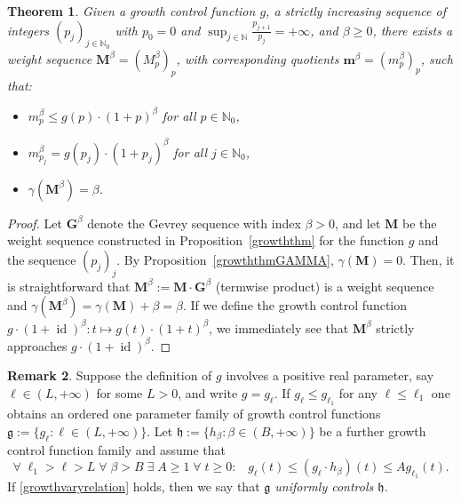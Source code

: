 \documentclass[12pt,a4paper]{article}
\newcommand{\M}{{\boldsymbol{M}}}
\newcommand{\m}{{\boldsymbol{m}}}
\newcommand{\id}{\operatorname{id}}
\newcommand{\ga}{\gamma}
\theoremstyle{plain}
\newtheorem{theorem}{Theorem}[section]
\theoremstyle{definition}
\newtheorem{remark}[theorem]{Remark}
\numberwithin{equation}{section}
\begin{document}
\begin{theorem}\label{growththm1}
Given a growth control function $g$, a strictly increasing sequence of integers  $(p_j)_{j\in\mathbb{N}_0}$ with $p_0=0$ and $\sup_{j\in\mathbb{N}}\frac{p_{j+1}}{p_j}=+\infty$, and $\beta\ge 0$, there exists a weight sequence $\M^{\beta}=(M^{\beta}_p)_p$, with corresponding quotients $\m^{\beta}=(m_p^\beta)_p$, such that:
\begin{itemize}
\item[$(i)$] $m^{\beta}_p\le g(p)\cdot(1+p)^{\beta}$ for all $p\in\mathbb{N}_0$,

\item[$(ii)$] $m^{\beta}_{p_j}=g(p_j)\cdot(1+p_j)^{\beta}$ for all $j\in\mathbb{N}_0$,

\item[$(iii)$] $\gamma(\M^{\beta})=\beta$.
\end{itemize}
\end{theorem}

\begin{proof}
Let $\boldsymbol{G}^{\beta}$ denote the Gevrey sequence with index $\beta>0$, and let $\M$ be the weight sequence constructed in Proposition~\ref{growththm} for the function $g$ and the sequence $(p_j)_j$. By Proposition~\ref{growththmGAMMA}, $\ga(\M)=0$. Then, it is straightforward that $\boldsymbol{M}^{\beta}:=\boldsymbol{M}\cdot\boldsymbol{G}^{\beta}$ (termwise product) is a weight sequence and $\gamma(\boldsymbol{M}^{\beta})=\gamma(\boldsymbol{M})+\beta=\beta$.
If we define the growth control function $g\cdot(1+\id)^{\beta}: t\mapsto g(t)\cdot(1+t)^{\beta}$, we immediately see that $\boldsymbol{M}^{\beta}$ strictly approaches $g\cdot(1+\id)^{\beta}$. \end{proof}

\begin{remark}
Suppose the definition of $g$ involves a positive real parameter, say $\ell\in(L,+\infty)$ for some $L>0$, and write $g=g_{\ell}$.
If $g_{\ell}\le g_{\ell_1}$ for any $\ell\le\ell_1$ one obtains an ordered one parameter family of growth control functions $\mathfrak{g}:=\{g_{\ell}: \ell\in(L,+\infty)\}$. Let $\mathfrak{h}:=\{h_{\beta}: \beta\in(B,+\infty)\}$ be a further growth control function family and assume that
\begin{equation}\label{growthvaryrelation}
\forall\;\ell_1>\ell>L\;\forall\;\beta>B\;\exists\;A\ge 1\;\forall\;t\ge 0:\;\;\;g_{\ell}(t)\le(g_{\ell}\cdot h_{\beta})(t)\le Ag_{\ell_1}(t).
\end{equation}
If \eqref{growthvaryrelation} holds, then we say that \emph{$\mathfrak{g}$ uniformly controls $\mathfrak{h}$.}
\end{remark}
\end{document}
